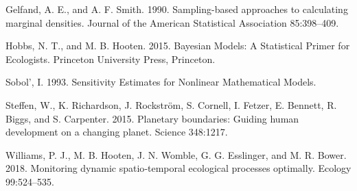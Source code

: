 \documentclass[12pt,]{article}
\begin{document}
\hypertarget{ref-Gelfand1990}{}
Gelfand, A. E., and A. F. Smith. 1990. Sampling-based approaches to
calculating marginal densities. Journal of the American Statistical
Association 85:398--409.

\hypertarget{ref-Hobbs2015}{}
Hobbs, N. T., and M. B. Hooten. 2015. Bayesian Models: A Statistical
Primer for Ecologists. Princeton University Press, Princeton.

\hypertarget{ref-Sobol1993}{}
Sobol', I. 1993. Sensitivity Estimates for Nonlinear Mathematical
Models.

\hypertarget{ref-Steffen2015}{}
Steffen, W., K. Richardson, J. Rockström, S. Cornell, I. Fetzer, E.
Bennett, R. Biggs, and S. Carpenter. 2015. Planetary boundaries: Guiding
human development on a changing planet. Science 348:1217.

\hypertarget{ref-Williams2018}{}
Williams, P. J., M. B. Hooten, J. N. Womble, G. G. Esslinger, and M. R.
Bower. 2018. Monitoring dynamic spatio‐temporal ecological processes
optimally. Ecology 99:524--535.
\end{document}
